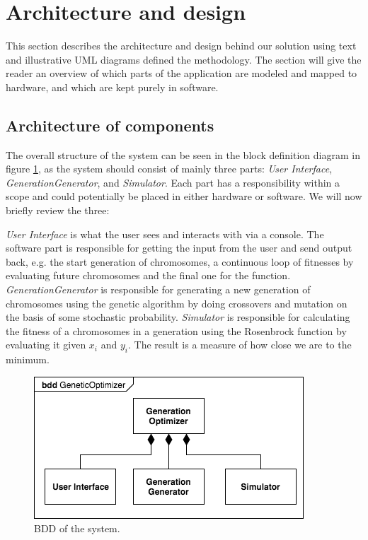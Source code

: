 \section{Architecture and design}\label{sec:archdesign}

This section describes the architecture and design behind our solution using text and illustrative UML diagrams defined the methodology. The section will give the reader an overview of which parts of the application are modeled and mapped to hardware, and which are kept purely in software.

\subsection{Architecture of components}

The overall structure of the system can be seen in the block definition diagram in figure \ref{fig:bdd}, as the system should consist of mainly three parts: \emph{User Interface}, \emph{GenerationGenerator}, and \emph{Simulator}. Each part has a responsibility within a scope and could potentially be placed in either hardware or software. We will now briefly review the three:

\emph{User Interface} is what the user sees and interacts with via a console. The software part is responsible for getting the input from the user and send output back, e.g. the start generation of chromosomes, a continuous loop of fitnesses by evaluating future chromosomes and the final one for the function.
\emph{GenerationGenerator} is responsible for generating a new generation of chromosomes using the genetic algorithm by doing crossovers and mutation on the basis of some stochastic probability.
\emph{Simulator} is responsible for calculating the fitness of a chromosomes in a generation using the Rosenbrock function by evaluating it given $x_{i}$ and $y_{i}$. The result is a measure of how close we are to the minimum.

\begin{figure}[h!]
	\centering
	\includegraphics[width=0.7\linewidth]{../diagrams/bdd.png}
	\caption{BDD of the system.}
	\label{fig:bdd}
\end{figure}

